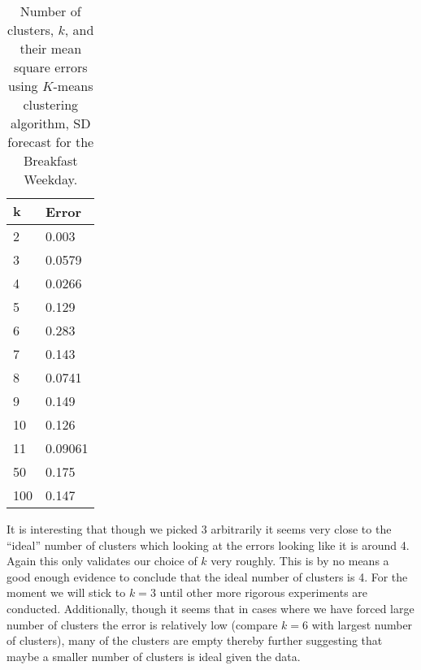 \documentclass[a4paper]{article}
\begin{document}
\begin{table}
\centering
\begin{tabular}{|l|l|}
\hline
$\textbf{k}$& \textbf{Error}\\
\hline
2 & 0.003\\
\hline
3 & 0.0579\\
\hline
4 & 0.0266\\
\hline
5 &0.129\\
\hline
6 & 0.283\\
\hline
7 & 0.143\\
\hline
8 & 0.0741\\
\hline
9 & 0.149\\
\hline
10 & 0.126 \\
\hline
11 & 0.09061\\
\hline
50 & 0.175\\
\hline
100 & 0.147\\
\hline
\end{tabular}
\caption{Number of clusters, $k$, and their mean square errors using $K$-means clustering algorithm, SD forecast for the Breakfast Weekday.}
\label{tab:cluserrs}
\end{table}

It is interesting that though we picked 3 arbitrarily it seems very close to the ``ideal'' number of clusters which looking at the errors looking like it is around 4. Again this only validates our choice of $k$ very roughly. This is by no means a good enough evidence to conclude that the ideal number of clusters is 4. For the moment we will stick to $k=3$ until other more rigorous experiments are conducted. %
Additionally, though it seems that in cases where we have forced large number of clusters the error is relatively low (compare $k=6$ with largest number of clusters), many of the clusters are empty thereby further suggesting that maybe a smaller number of clusters is ideal given the data.

\end{document}
